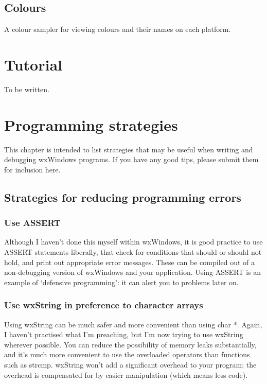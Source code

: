 \section{Colours}\label{coloursampler}

A colour sampler for viewing colours and their names on each
platform.

%
\chapter{Tutorial}\label{tutorial}
%
\setfooter{\thepage}{}{}{}{}{\thepage}%

To be written.

\chapter{Programming strategies}\label{strategies}
%
\setfooter{\thepage}{}{}{}{}{\thepage}%

This chapter is intended to list strategies that may be useful when
writing and debugging wxWindows programs. If you have any good tips,
please submit them for inclusion here.

\section{Strategies for reducing programming errors}

\subsection{Use ASSERT}

Although I haven't done this myself within wxWindows, it is good
practice to use ASSERT statements liberally, that check for conditions that
should or should not hold, and print out appropriate error messages.
These can be compiled out of a non-debugging version of wxWindows
and your application. Using ASSERT is an example of `defensive programming':
it can alert you to problems later on.

\subsection{Use wxString in preference to character arrays}

Using wxString can be much safer and more convenient than using char *.
Again, I haven't practised what I'm preaching, but I'm now trying to use
wxString wherever possible. You can reduce the possibility of memory
leaks substantially, and it's much more convenient to use the overloaded
operators than functions such as strcmp. wxString won't add a significant
overhead to your program; the overhead is compensated for by easier
manipulation (which means less code).

